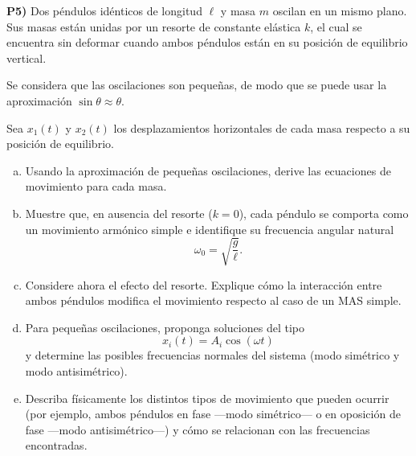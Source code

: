 \textbf{P5)} Dos péndulos idénticos de longitud $\ell$ y masa $m$ oscilan en un mismo plano. Sus masas están unidas por un resorte de constante elástica $k$, el cual se encuentra sin deformar cuando ambos péndulos están en su posición de equilibrio vertical.

Se considera que las oscilaciones son pequeñas, de modo que se puede usar la aproximación $\sin\theta\approx\theta$.

Sea $x_1(t)$ y $x_2(t)$ los desplazamientos horizontales de cada masa respecto a su posición de equilibrio.

\begin{enumerate}[a)]
  \item Usando la aproximación de pequeñas oscilaciones, derive las ecuaciones de movimiento para cada masa.
  \item Muestre que, en ausencia del resorte ($k=0$), cada péndulo se comporta como un movimiento armónico simple e identifique su frecuencia angular natural
  \[\omega_0=\sqrt{\frac{g}{\ell}}.\]
  \item Considere ahora el efecto del resorte. Explique cómo la interacción entre ambos péndulos modifica el movimiento respecto al caso de un MAS simple.
  \item Para pequeñas oscilaciones, proponga soluciones del tipo
  \[x_i(t)=A_i\cos(\omega t)\]
  y determine las posibles frecuencias normales del sistema (modo simétrico y modo antisimétrico).
  \item Describa físicamente los distintos tipos de movimiento que pueden ocurrir (por ejemplo, ambos péndulos en fase —modo simétrico— o en oposición de fase —modo antisimétrico—) y cómo se relacionan con las frecuencias encontradas.
\end{enumerate}

\vspace{0.3cm}
